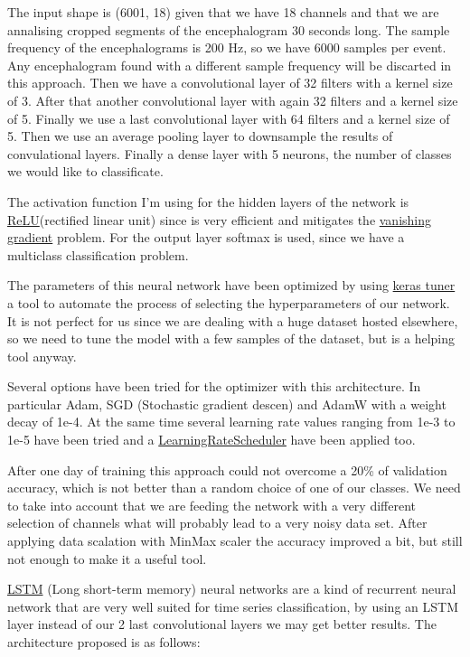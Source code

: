 The input shape is (6001, 18) given that we have 18 channels and that we are annalising cropped segments of the encephalogram 30 seconds long. The sample frequency of the encephalograms is 200 Hz, so we have 6000 samples per event. Any encephalogram found with a different sample frequency will be discarted in this approach. Then we have a convolutional layer of 32 filters with a kernel size of 3. After that another convolutional layer with again 32 filters and a kernel size of 5. Finally we use a last convolutional layer with 64 filters and a kernel size of 5. Then we use an average pooling layer to downsample the results of convulational layers. Finally a dense layer with 5 neurons, the number of classes we would like to classificate.

The activation function I'm using for the hidden layers of the network is \href{https://en.wikipedia.org/wiki/Rectifier_(neural_networks)}{ReLU}(rectified linear unit) since is very efficient and mitigates the \href{https://en.wikipedia.org/wiki/Vanishing_gradient_problem}{vanishing gradient} problem. For the output layer softmax is used, since we have a multiclass classification problem.

The parameters of this neural network have been optimized by using \href{https://keras.io/keras_tuner/}{keras tuner} a tool to automate the process of selecting the hyperparameters of our network. It is not perfect for us since we are dealing with a huge dataset hosted elsewhere, so we need to tune the model with a few samples of the dataset, but is a helping tool anyway.

Several options have been tried for the optimizer with this architecture. In particular Adam, SGD (Stochastic gradient descen) and AdamW with a weight decay of 1e-4. At the same time several learning rate values ranging from 1e-3 to 1e-5 have been tried and a \href{https://keras.io/api/callbacks/learning_rate_scheduler/}{LearningRateScheduler} have been applied too.

After one day of training this approach could not overcome a 20\% of validation accuracy, which is not better than a random choice of one of our classes. We need to take into account that we are feeding the network with a very different selection of channels what will probably lead to a very noisy data set. After applying data scalation with MinMax scaler the accuracy improved a bit, but still not enough to make it a useful tool.

\href{https://en.wikipedia.org/wiki/Long_short-term_memory}{LSTM} (Long short-term memory) neural networks are a kind of recurrent neural network that are very well suited for time series classification, by using an LSTM layer instead of our 2 last convolutional layers we may get better results. The architecture proposed is as follows:

